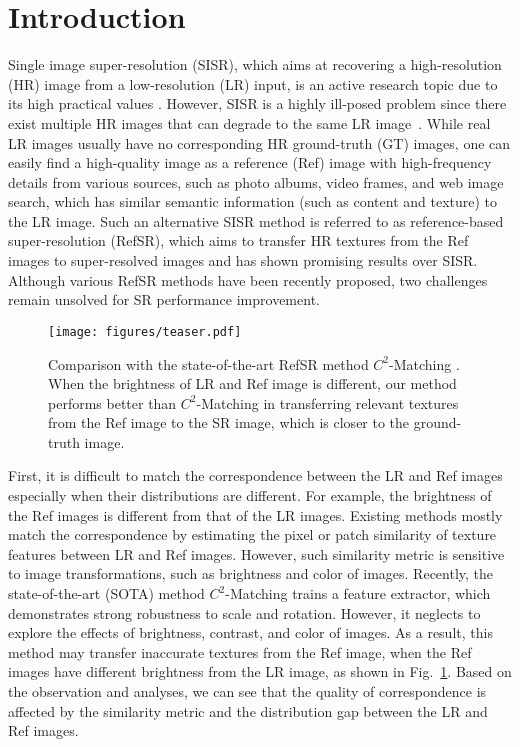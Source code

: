 \documentclass[runningheads]{llncs}
\begin{document}
\section{Introduction}
Single image super-resolution (SISR), which aims at recovering a high-resolution (HR) image from a low-resolution (LR) input, is an active research topic due to its high practical values
\cite{Jo_2021_CVPR,zhang2018ffdnet,li2019SRFBN,kai2021bsrgan,Wang_2021_CVPR,Khrulkov_2021_CVPR,Xing_2021_CVPR,liang2021mutual,Kong_2021_CVPR,Kar_2021_CVPR,guo2020hierarchical,liang2021hierarchical}.
However, SISR is a highly ill-posed problem since there exist multiple HR images that can degrade to the same LR image~\cite{ulyanov2018deep,guo2020drn}.
While real LR images usually have no corresponding HR ground-truth (GT) images, one can easily find a high-quality image as a reference (Ref) image with high-frequency details from various sources, such as photo albums, video frames, and web image search, which has similar semantic information (such as content and texture) to the LR image. 
Such an alternative SISR method is referred to as reference-based super-resolution (RefSR), which aims to transfer HR textures from the Ref images to super-resolved images and has shown promising results over SISR. 
Although various RefSR methods \cite{jiang2021robust,lu2021masa,yantowards,xie2020feature} have been recently proposed, two challenges remain unsolved for SR performance improvement. 

\begin{figure}[t]
\setlength\belowcaptionskip{-5pt}
\centering
\texttt{[image: figures/teaser.pdf]}
\caption{Comparison with the state-of-the-art RefSR method $C^2$-Matching \cite{jiang2021robust}. When the brightness of LR and Ref image is different, our method performs better than $C^2$-Matching \cite{jiang2021robust} in transferring relevant textures from the Ref image to the SR image, which is closer to the ground-truth image. 
}
\label{fig:teaser}
\end{figure}


First, it is difficult to match the correspondence between the LR and Ref images especially when their distributions are different. 
For example, the brightness of the Ref images is different from that of the LR images.
Existing methods \cite{zhang2019image,yang2020learning} mostly match the correspondence by estimating the pixel or patch similarity of texture features between LR and Ref images.
However, such similarity metric is sensitive to image transformations, such as brightness and color of images.
Recently, the state-of-the-art (SOTA) method $C^2$-Matching \cite{jiang2021robust} 
trains a feature extractor, which demonstrates strong robustness to scale and rotation. 
However, it neglects to explore the effects of brightness, contrast, and color of images.
As a result, this method may transfer inaccurate textures from the Ref image, when the Ref images have different brightness from the LR image, as shown in Fig.~\ref{fig:teaser}. 
Based on the observation and analyses, we can see that the quality of correspondence is affected by the similarity metric and the distribution gap between the LR and Ref images.
\end{document}
